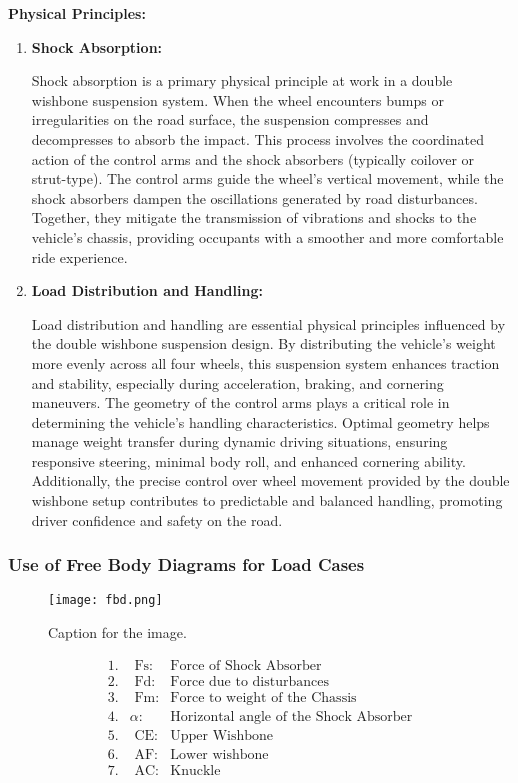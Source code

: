 \textbf{Physical Principles:}

\begin{enumerate}
    \item \textbf{Shock Absorption:}
    
    Shock absorption is a primary physical principle at work in a double wishbone suspension system. When the wheel encounters bumps or irregularities on the road surface, the suspension compresses and decompresses to absorb the impact. This process involves the coordinated action of the control arms and the shock absorbers (typically coilover or strut-type). The control arms guide the wheel's vertical movement, while the shock absorbers dampen the oscillations generated by road disturbances. Together, they mitigate the transmission of vibrations and shocks to the vehicle's chassis, providing occupants with a smoother and more comfortable ride experience.
    
    \item \textbf{Load Distribution and Handling:}
    
    Load distribution and handling are essential physical principles influenced by the double wishbone suspension design. By distributing the vehicle's weight more evenly across all four wheels, this suspension system enhances traction and stability, especially during acceleration, braking, and cornering maneuvers. The geometry of the control arms plays a critical role in determining the vehicle's handling characteristics. Optimal geometry helps manage weight transfer during dynamic driving situations, ensuring responsive steering, minimal body roll, and enhanced cornering ability. Additionally, the precise control over wheel movement provided by the double wishbone setup contributes to predictable and balanced handling, promoting driver confidence and safety on the road.
\end{enumerate}

\newpage
\subsubsection{Use of Free Body Diagrams for Load Cases}
\begin{figure}[ht!]
  \centering
  \texttt{[image: fbd.png]}
  \caption{Caption for the image.}
  \label{fig:image1}
\end{figure}

\newpage
\begin{align*}
1. & \text{ Fs:} & \text{Force of Shock Absorber} \\
2. & \text{ Fd:} & \text{Force due to disturbances} \\
3. & \text{ Fm:} & \text{Force to weight of the Chassis} \\
4. & \alpha: & \text{Horizontal angle of the Shock Absorber} \\
5. & \text{ CE:} & \text{Upper Wishbone} \\
6. & \text{ AF:} & \text{Lower wishbone} \\
7. & \text{ AC:} & \text{Knuckle} \\
\end{align*}

